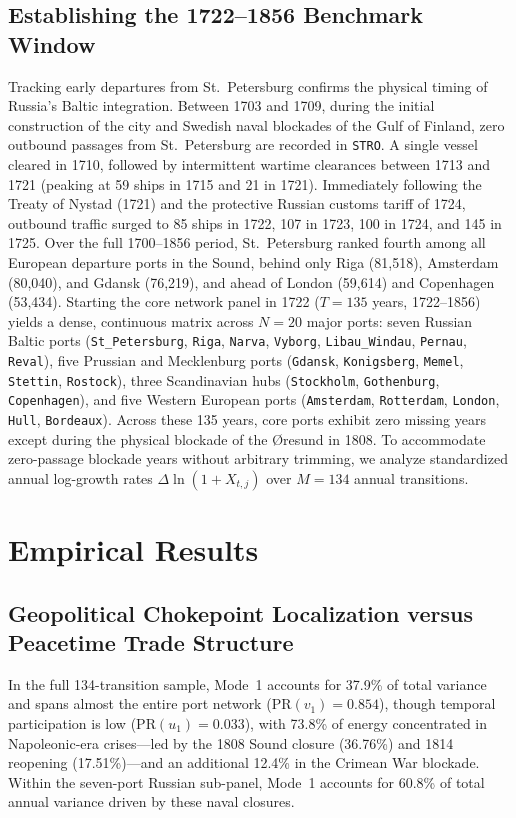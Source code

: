 \documentclass[11pt,a4paper]{article}
\begin{document}
\subsection{Establishing the 1722--1856 Benchmark Window}
Tracking early departures from St.~Petersburg confirms the physical timing of Russia's Baltic integration. Between 1703 and 1709, during the initial construction of the city and Swedish naval blockades of the Gulf of Finland, zero outbound passages from St.~Petersburg are recorded in \texttt{STRO}. A single vessel cleared in 1710, followed by intermittent wartime clearances between 1713 and 1721 (peaking at 59 ships in 1715 and 21 in 1721). Immediately following the Treaty of Nystad (1721) and the protective Russian customs tariff of 1724, outbound traffic surged to 85 ships in 1722, 107 in 1723, 100 in 1724, and 145 in 1725. Over the full 1700--1856 period, St.~Petersburg ranked fourth among all European departure ports in the Sound, behind only Riga (81,518), Amsterdam (80,040), and Gdansk (76,219), and ahead of London (59,614) and Copenhagen (53,434).
Starting the core network panel in 1722 ($T = 135$ years, 1722--1856) yields a dense, continuous matrix across $N = 20$ major ports: seven Russian Baltic ports (\texttt{St\_Petersburg}, \texttt{Riga}, \texttt{Narva}, \texttt{Vyborg}, \texttt{Libau\_Windau}, \texttt{Pernau}, \texttt{Reval}), five Prussian and Mecklenburg ports (\texttt{Gdansk}, \texttt{Konigsberg}, \texttt{Memel}, \texttt{Stettin}, \texttt{Rostock}), three Scandinavian hubs (\texttt{Stockholm}, \texttt{Gothenburg}, \texttt{Copenhagen}), and five Western European ports (\texttt{Amsterdam}, \texttt{Rotterdam}, \texttt{London}, \texttt{Hull}, \texttt{Bordeaux}). Across these 135 years, core ports exhibit zero missing years except during the physical blockade of the Øresund in 1808. To accommodate zero-passage blockade years without arbitrary trimming, we analyze standardized annual log-growth rates $\Delta \ln(1 + X_{t,j})$ over $M = 134$ annual transitions.

\section{Empirical Results}
\subsection{Geopolitical Chokepoint Localization versus Peacetime Trade Structure}
In the full 134-transition sample, Mode~1 accounts for 37.9\% of total variance and spans almost the entire port network ($\mathrm{PR}(v_1) = 0.854$), though temporal participation is low ($\mathrm{PR}(u_1) = 0.033$), with 73.8\% of energy concentrated in Napoleonic-era crises—led by the 1808 Sound closure (36.76\%) and 1814 reopening (17.51\%)—and an additional 12.4\% in the Crimean War blockade. Within the seven-port Russian sub-panel, Mode~1 accounts for 60.8\% of total annual variance driven by these naval closures.
\end{document}
